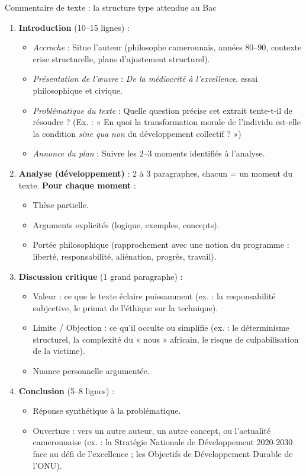\documentclass[11pt]{article}
\newcommand{\cle}[1]{{\popxbold\color{popdark}#1}}
\begin{document}
\begin{methode}{Commentaire de texte : la structure type attendue au Bac}
\begin{enumerate}
    \item \textbf{Introduction} (10--15 lignes) : 
    \begin{itemize}
        \item \emph{Accroche} : Situe l'auteur (philosophe camerounais, années 80--90, contexte crise structurelle, plans d'ajustement structurel).
        \item \emph{Présentation de l'œuvre} : \emph{De la médiocrité à l'excellence}, essai philosophique et civique.
        \item \emph{Problématique du texte} : Quelle question précise cet extrait tente-t-il de résoudre ? (Ex. : « En quoi la transformation morale de l'individu est-elle la condition \emph{sine qua non} du développement collectif ? »)
        \item \emph{Annonce du plan} : Suivre les 2--3 moments identifiés à l'analyse.
    \end{itemize}
    \item \textbf{Analyse (développement)} : 2 à 3 paragraphes, chacun = un moment du texte. \textbf{Pour chaque moment} : 
    \begin{itemize}
        \item Thèse partielle.
        \item Arguments explicités (logique, exemples, concepts).
        \item Portée philosophique (rapprochement avec une notion du programme : liberté, responsabilité, aliénation, progrès, travail).
    \end{itemize}
    \item \textbf{Discussion critique} (1 grand paragraphe) : 
    \begin{itemize}
        \item Valeur : ce que le texte éclaire puissamment (ex. : la responsabilité subjective, le primat de l'éthique sur la technique).
        \item Limite / Objection : ce qu'il occulte ou simplifie (ex. : le déterminisme structurel, la complexité du « nous » africain, le risque de culpabilisation de la victime).
        \item Nuance personnelle argumentée.
    \end{itemize}
    \item \textbf{Conclusion} (5--8 lignes) : 
    \begin{itemize}
        \item Réponse synthétique à la problématique.
        \item Ouverture : vers un autre auteur, un autre concept, ou l'actualité camerounaise (ex. : la \cle{Stratégie Nationale de Développement 2020-2030} face au défi de l'excellence ; les Objectifs de Développement Durable de l'ONU).
    \end{itemize}
\end{enumerate}
\end{methode}
\end{document}
